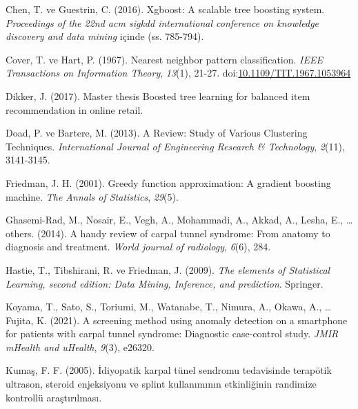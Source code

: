 \documentclass[12pt,twoside]{deuthesis}
\begin{document}
\begin{CSLReferences}
\leavevmode{}%
Chen, T. ve Guestrin, C. (2016). Xgboost: A scalable tree boosting system. \emph{Proceedings of the 22nd acm sigkdd international conference on knowledge discovery and data mining} içinde (ss. 785-794).

\leavevmode{}%
Cover, T. ve Hart, P. (1967). Nearest neighbor pattern classification. \emph{IEEE Transactions on Information Theory}, \emph{13}(1), 21-27. doi:\href{https://doi.org/10.1109/TIT.1967.1053964}{10.1109/TIT.1967.1053964}

\leavevmode{}%
Dikker, J. (2017). Master thesis Boosted tree learning for balanced item recommendation in online retail.

\leavevmode{}%
Doad, P. ve Bartere, M. (2013). A Review: Study of Various Clustering Techniques. \emph{International Journal of Engineering Research \& Technology}, \emph{2}(11), 3141-3145.

\leavevmode{}%
Friedman, J. H. (2001). Greedy function approximation: A gradient boosting machine. \emph{The Annals of Statistics}, \emph{29}(5).

\leavevmode{}%
Ghasemi-Rad, M., Nosair, E., Vegh, A., Mohammadi, A., Akkad, A., Lesha, E., \ldots{} others. (2014). A handy review of carpal tunnel syndrome: From anatomy to diagnosis and treatment. \emph{World journal of radiology}, \emph{6}(6), 284.

\leavevmode{}%
Hastie, T., Tibshirani, R. ve Friedman, J. (2009). \emph{The elements of Statistical Learning, second edition: Data Mining, Inference, and prediction}. Springer.

\leavevmode{}%
Koyama, T., Sato, S., Toriumi, M., Watanabe, T., Nimura, A., Okawa, A., \ldots{} Fujita, K. (2021). A screening method using anomaly detection on a smartphone for patients with carpal tunnel syndrome: Diagnostic case-control study. \emph{JMIR mHealth and uHealth}, \emph{9}(3), e26320.

\leavevmode{}%
Kumaş, F. F. (2005). İdiyopatik karpal tünel sendromu tedavisinde terapötik ultrason, steroid enjeksiyonu ve splint kullanımının etkinliğinin randimize kontrollü araştırılması.


\end{CSLReferences}
\end{document}
